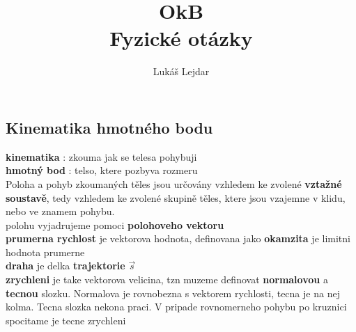 \documentclass{report}
\title{\Huge{OkB}\\Fyzické otázky}
\author{\huge{Lukáš Lejdar}}
\date{}
\begin{document}
\maketitle
\newpage%
\tableofcontents
\pagebreak

\chapter{}


\section{Kinematika hmotného bodu}
\vspace{0.5cm}
\textbf{kinematika} : zkouma jak se telesa pohybuji \\
\textbf{hmotný bod} : telso, ktere pozbyva rozmeru \\ 
Poloha a pohyb zkoumaných těles jsou určovány vzhledem ke zvolené \textbf{vztažné soustavě}, tedy vzhledem ke zvolené skupině těles, ktere jsou vzajemne v klidu, nebo ve znamem pohybu. \\
polohu vyjadrujeme pomoci \textbf{polohoveho vektoru} \\
\textbf{prumerna rychlost} je vektorova hodnota, definovana jako 
\textbf{okamzita} je limitni hodnota prumerne \\    
\textbf{draha} je delka \textbf{trajektorie} $\vec{s}$ \\
\textbf{zrychleni} je take vektorova velicina, tzn muzeme definovat \textbf{normalovou} a \textbf{tecnou} slozku. Normalova je rovnobezna s vektorem rychlosti, tecna je na nej kolma. Tecna slozka nekona praci.
V pripade rovnomerneho pohybu po kruznici spocitame je tecne zrychleni 

\newpage
\end{document}
